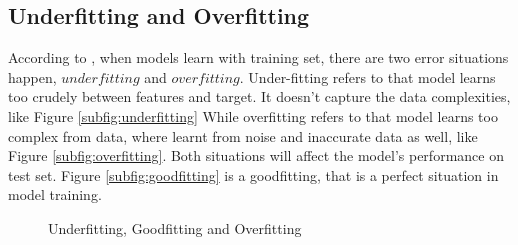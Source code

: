 \documentclass[12pt,a4paper,english
]{tunithesis}
\begin{document}
\subsection{Underfitting and Overfitting}
According to \textcite{stanford_ml}, when models learn with training set, there are two error situations happen, $underfitting$ and $overfitting$. Under-fitting refers to that model learns too crudely between features and target. It doesn't capture the data complexities, like Figure \ref{subfig:underfitting} While overfitting refers to that model learns too complex from data, where learnt from noise and inaccurate data as well, like Figure \ref{subfig:overfitting}. Both situations will affect the model's performance on test set. Figure \ref{subfig:goodfitting} is a goodfitting, that is a perfect situation in model training.
\begin{figure}
  \begin{center}
    \caption[Under, Good and Overfitting]{Underfitting, Goodfitting and Overfitting}
    \label{fig:different_fitting}
  \end{center}
\end{figure}
\end{document}
